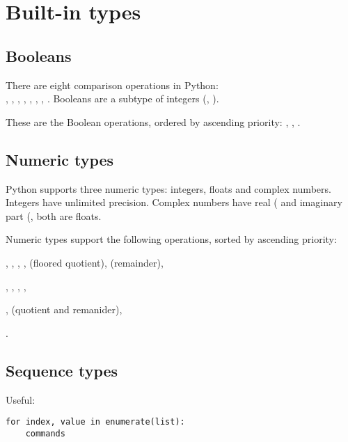\section{Built-in types}
\subsection{Booleans}
There are eight comparison operations in Python: \\
\python{<}, \python{<=}, \python{>}, \python{>=}, 
\python{==}, \python{!=}, , .
Booleans are a subtype of integers (, ).

These are the Boolean operations, ordered by ascending priority: ,
, .

\subsection{Numeric types}
Python supports three numeric types: integers, floats and complex numbers.
Integers have unlimited precision.
Complex numbers have real ( and imaginary part (,
both are floats.

Numeric types support the following operations, sorted by ascending priority:
\begin{compactenum}
\item \python{+}, \python{-}, \python{*}, \python{/}, \python{//} (floored quotient), \python{\%} (remainder),
\item {}, , , ,
\item {},  (quotient and remanider),
\item {}.
\end{compactenum}


\subsection{Sequence types}
Useful:
\begin{verbatim}
for index, value in enumerate(list):
    commands
\end{verbatim}

